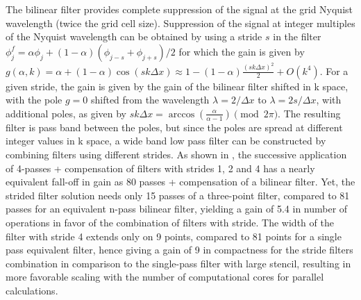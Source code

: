 \documentclass[]{report}
\begin{document}
The bilinear filter provides complete suppression of the signal at
the grid Nyquist wavelength (twice the grid cell size). Suppression
of the signal at integer multiples of the Nyquist wavelength can be
obtained by using a stride $s$ in the filter $\phi_{j}^{f}=\alpha\phi_{j}+\left(1-\alpha\right)\left(\phi_{j-s}+\phi_{j+s}\right)/2$
for which the gain is given by $g\left(\alpha,k\right)=\alpha+\left(1-\alpha\right)\cos\left(sk\Delta x\right)\approx1-\left(1-\alpha\right)\frac{\left(sk\Delta x\right)^{2}}{2}+O\left(k^{4}\right)$.
For a given stride, the gain is given by the gain of the bilinear
filter shifted in k space, with the pole $g=0$ shifted from the wavelength
$\lambda=2/\Delta x$ to $\lambda=2s/\Delta x$, with additional poles,
as given by $sk\Delta x=\arccos\left(\frac{\alpha}{\alpha-1}\right)\pmod{2\pi}$.
The resulting filter is pass band between the poles, but since the
poles are spread at different integer values in k space, a wide band
low pass filter can be constructed by combining filters using different
strides. As shown in \cite{Vayjcp2011}, the successive application
of 4-passes + compensation of filters with strides 1, 2 and 4 has
a nearly equivalent fall-off in gain as 80 passes + compensation of
a bilinear filter. Yet, the strided filter solution needs only 15
passes of a three-point filter, compared to 81 passes for an equivalent
n-pass bilinear filter, yielding a gain of 5.4 in number of operations
in favor of the combination of filters with stride. The width of the
filter with stride 4 extends only on 9 points, compared to 81 points
for a single pass equivalent filter, hence giving a gain of 9 in compactness
for the stride filters combination in comparison to the single-pass
filter with large stencil, resulting in more favorable scaling with the number
of computational cores for parallel calculations.



 {\typeout{} \typeout{{*}{*}{*}{*}{*}{*}{*}{*}{*}{*}{*}{*}{*}{*}{*}{*}{*}{*}{*}{*}{*}{*}{*}{*}{*}{*}{*}{*}{*}{*}{*}{*}{*}{*}{*}{*}{*}{*}{*}{*}{*}{*}}
 
 \typeout{{*}{*}{*}{*}{*}{*}{*}{*}{*}{*}{*}{*}{*}{*}{*}{*}{*}{*}{*}{*}{*}{*}{*}{*}{*}{*}{*}{*}{*}{*}{*}{*}{*}{*}{*}{*}{*}{*}{*}{*}{*}{*}}
\typeout{} }
\end{document}
